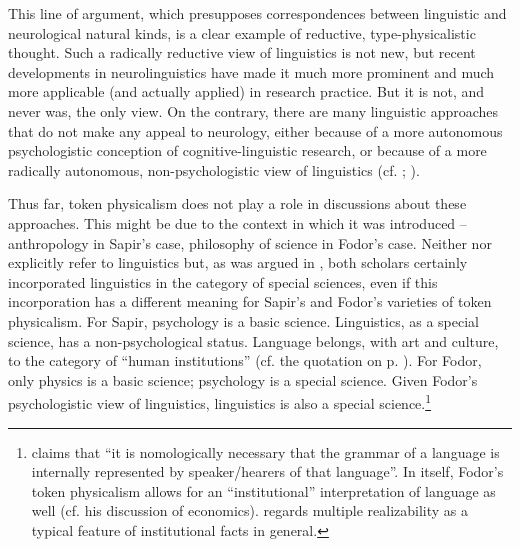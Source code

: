 \documentclass[output=paper]{langscibook}
\begin{document}
This line of argument, which presupposes correspondences between linguistic and neurological natural kinds, is a clear example of reductive, type-physicalistic thought. Such a radically reductive view of linguistics is not new, but recent developments in neurolinguistics have made it much more prominent and much more applicable (and actually applied) in research practice. But it is not, and never was, the only view. On the contrary, there are many linguistic approaches that do not make any appeal to neurology, either because of a more autonomous psychologistic conception of cognitive-linguistic research, or because of a more radically autonomous, non-psychologistic view of linguistics (cf. \citealt{Botha1992}; \citealt{Elffers2014}).

Thus far, token physicalism does not play a role in discussions about these approaches. This might be due to the context in which it was introduced -- anthropology in Sapir's case, philosophy of science in Fodor's case. Neither \citet{Sapir1917} nor \citet{Fodor1974} explicitly refer to linguistics but, as was argued in , both scholars certainly incorporated linguistics in the category of special sciences, even if this incorporation has a different meaning for Sapir's and Fodor's varieties of token physicalism. For Sapir, psychology is a basic science. Linguistics, as a special science, has a non-psychological status. Language belongs, with art and culture, to the category of ``human institutions'' (cf. the quotation on p. \pageref{q:elffers:huminst}). For Fodor, only physics is a basic science; psychology is a special science. Given Fodor's psychologistic view of linguistics, linguistics is also a special science.\footnote{\citet[149]{Fodor1985} claims that ``it is nomologically necessary that the grammar of a language is internally represented by speaker/hearers of that language''. In itself, Fodor's token physicalism allows for an ``institutional'' interpretation of language as well (cf. his discussion of economics). \citet[422--423]{Jones2004} regards multiple realizability as a typical feature of institutional facts in general.\label{fn:elffers:nomologically}}
\end{document}
